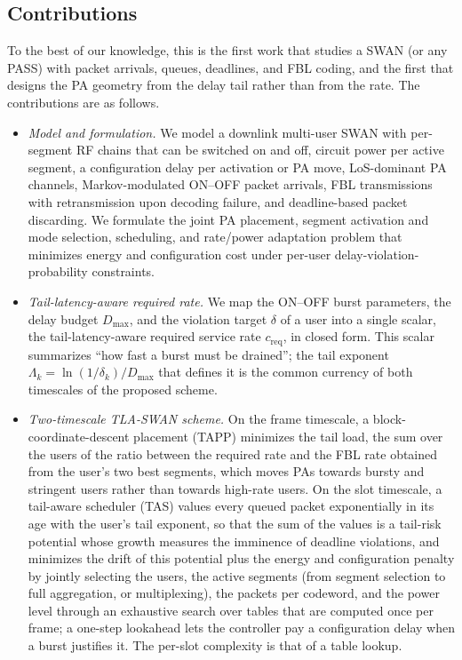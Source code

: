 \documentclass[journal]{IEEEtran}
\newcommand{\creq}{c_{\mathrm{req}}}
\newcommand{\Dmax}{D_{\max}}
\begin{document}
\subsection{Contributions}
To the best of our knowledge, this is the first work that studies a SWAN (or any PASS) with packet arrivals, queues, deadlines, and FBL coding, and the first that designs the PA geometry from the delay tail rather than from the rate. The contributions are as follows.
\begin{itemize}[leftmargin=*]
\item \emph{Model and formulation.} We model a downlink multi-user SWAN with per-segment RF chains that can be switched on and off, circuit power per active segment, a configuration delay per activation or PA move, LoS-dominant PA channels, Markov-modulated ON--OFF packet arrivals, FBL transmissions with retransmission upon decoding failure, and deadline-based packet discarding. We formulate the joint PA placement, segment activation and mode selection, scheduling, and rate/power adaptation problem that minimizes energy and configuration cost under per-user delay-violation-probability constraints.
\item \emph{Tail-latency-aware required rate.} We map the ON--OFF burst parameters, the delay budget $\Dmax$, and the violation target $\delta$ of a user into a single scalar, the tail-latency-aware required service rate $\creq$, in closed form. This scalar summarizes ``how fast a burst must be drained''; the tail exponent $\Lambda_k=\ln(1/\delta_k)/\Dmax$ that defines it is the common currency of both timescales of the proposed scheme.
\item \emph{Two-timescale TLA-SWAN scheme.} On the frame timescale, a block-coordinate-descent placement (TAPP) minimizes the tail load, the sum over the users of the ratio between the required rate and the FBL rate obtained from the user's two best segments, which moves PAs towards bursty and stringent users rather than towards high-rate users. On the slot timescale, a tail-aware scheduler (TAS) values every queued packet exponentially in its age with the user's tail exponent, so that the sum of the values is a tail-risk potential whose growth measures the imminence of deadline violations, and minimizes the drift of this potential plus the energy and configuration penalty by jointly selecting the users, the active segments (from segment selection to full aggregation, or multiplexing), the packets per codeword, and the power level through an exhaustive search over tables that are computed once per frame; a one-step lookahead lets the controller pay a configuration delay when a burst justifies it. The per-slot complexity is that of a table lookup.

\end{itemize}
\end{document}

